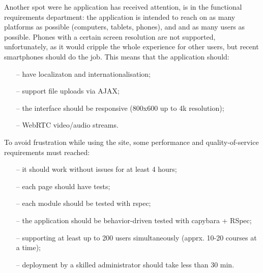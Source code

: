 Another spot were he application has received attention, is in the functional requirements department:
the application is intended to reach on as many platforms as possible (computers, tablets, phones), and and
as many users as possible. Phones with a certain screen resolution are not supported, unfortunately, as it
would cripple the whole experience for other users, but recent smartphones
should do the job. This means that the application should:
\begin{enumerate}[topsep=5pt, partopsep=0pt,itemsep=3pt,parsep=1pt]
    \item[--] have localizaton and internationalisation;
    \item[--] support file uploads via AJAX;
    \item[--] the interface should be responsive (800x600 up to 4k resolution);
    \item[--] WebRTC video/audio streams.
\end{enumerate}

To avoid frustration while using the site, some performance and quality-of-service requirements
must reached:
\begin{enumerate}[topsep=5pt, partopsep=0pt,itemsep=3pt,parsep=1pt]
    \item[--] it should work without issues for at least 4 hours;
    \item[--] each page should have tests;
    \item[--] each module should be tested with rspec;
    \item[--] the application should be behavior-driven tested with capybara + RSpec;
    \item[--] supporting at least up to 200 users simultaneously (apprx. 10-20 courses at a time);
    \item[--] deployment by a skilled administrator should take less than 30 min.
\end{enumerate}

